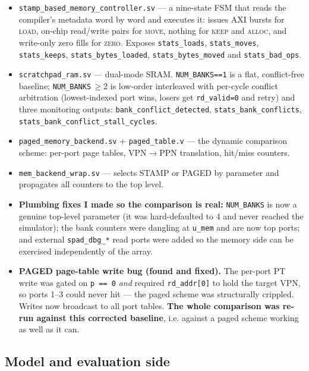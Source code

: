 \documentclass[11pt,a4paper]{article}
\newcommand{\op}[1]{\textsc{#1}}
\newcommand{\file}[1]{\texttt{\small #1}}
\begin{document}
\begin{itemize}[leftmargin=1.5em,itemsep=3pt]
  \item \file{stamp\_based\_memory\_controller.sv} --- a nine-state FSM that
        reads the compiler's metadata word by word and executes it: issues AXI
        bursts for \op{load}, on-chip read/write pairs for \op{move}, nothing
        for \op{keep} and \op{alloc}, and write-only zero fills for \op{zero}.
        Exposes \file{stats\_loads}, \file{stats\_moves}, \file{stats\_keeps},
        \file{stats\_bytes\_loaded}, \file{stats\_bytes\_moved} and
        \file{stats\_bad\_ops}.
  \item \file{scratchpad\_ram.sv} --- dual-mode SRAM. \file{NUM\_BANKS==1} is a
        flat, conflict-free baseline; \file{NUM\_BANKS}$\,\ge 2$ is low-order
        interleaved with per-cycle conflict arbitration (lowest-indexed port
        wins, losers get \file{rd\_valid=0} and retry) and three monitoring
        outputs: \file{bank\_conflict\_detected},
        \file{stats\_bank\_conflicts},
        \file{stats\_bank\_conflict\_stall\_cycles}.
  \item \file{paged\_memory\_backend.sv} + \file{paged\_table.v} --- the
        dynamic comparison scheme: per-port page tables, VPN$\to$PPN
        translation, hit/miss counters.
  \item \file{mem\_backend\_wrap.sv} --- selects STAMP or PAGED by parameter
        and propagates all counters to the top level.
  \item \textbf{Plumbing fixes I made so the comparison is real:}
        \file{NUM\_BANKS} is now a genuine top-level parameter (it was
        hard-defaulted to 4 and never reached the simulator); the bank counters
        were dangling at \file{u\_mem} and are now top ports; and external
        \file{spad\_dbg\_*} read ports were added so the memory side can be
        exercised independently of the array.
  \item \textbf{PAGED page-table write bug (found and fixed).} The per-port PT
        write was gated on \verb|p == 0| \emph{and} required \file{rd\_addr[0]}
        to hold the target VPN, so ports 1--3 could never hit --- the paged
        scheme was structurally crippled. Writes now broadcast to all port
        tables. \textbf{The whole comparison was re-run against this corrected
        baseline}, i.e. against a paged scheme working as well as it can.
\end{itemize}

\subsection{Model and evaluation side}
\end{document}
